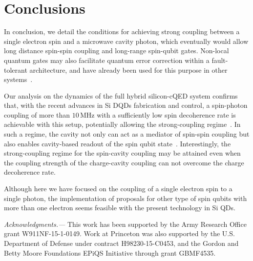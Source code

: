 \documentclass[twocolumn,english,aps,prl,preprint,reprint,showpacs,longbibliography,showkeys]{revtex4-1}
\begin{document}
\section{Conclusions}
\label{sec:conclusions}

In conclusion, we detail the conditions for achieving  strong coupling between a single electron spin and a microwave cavity photon, which eventually would allow long distance spin-spin coupling and long-range spin-qubit gates. 
Non-local quantum gates may also facilitate quantum error correction within a fault-tolerant architecture, and have already been used for this purpose in other systems~\cite{Taylor2005,Reed2012,Waldherr2014}.
 
Our analysis on the dynamics of the full hybrid silicon-cQED system confirms that, 
with the recent advances in  Si DQDs fabrication and control, a spin-photon coupling of more than $10\,\mathrm{MHz}$ with a sufficiently low spin decoherence rate is achievable with this setup, potentially allowing the strong-coupling regime~\cite{Zajac2016,Mi2017b}.
In such a regime, the cavity not only can act as a mediator  of spin-spin coupling but also enables cavity-based readout of the spin qubit state~\cite{Kawakami2014,Takeda2016}.
Interestingly, the strong-coupling regime for the spin-cavity coupling may be attained even when the coupling strength of the charge-cavity coupling can not overcome the charge decoherence rate.   

Although here we have focused on the coupling of a single electron spin to a single photon, the implementation of proposals for other type of spin qubits with more than one electron \cite{Burkard2006,Jin2012,Taylor2013,Guido_RX_PRB_2015}  seems feasible with the present technology in Si QDs. 



\begin{acknowledgments}
\textit{Acknowledgments.---}
This work has been supported by the Army Research Office grant W911NF-15-1-0149. 
Work at Princeton was also supported by 
 the U.S. Department of Defense under contract H98230-15-C0453, and the Gordon and Betty Moore Foundations EPiQS Initiative through grant GBMF4535.
\end{acknowledgments}


\appendix

\end{document}
